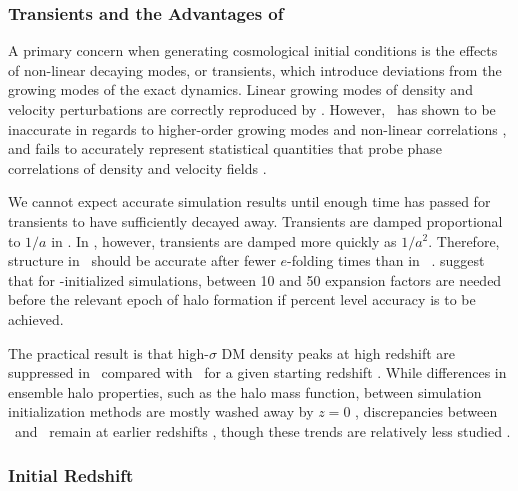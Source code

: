 \subsubsection{Transients and the Advantages of \lpt}
\label{subsubsec:computational_theory--perturbation_theory--transients}


A primary concern when generating cosmological initial conditions is the effects of non-linear decaying modes, or transients, which introduce deviations from the growing modes of the exact dynamics.  Linear growing modes of density and velocity perturbations are correctly reproduced by \za.  However, \za\ has shown to be inaccurate in regards to higher-order growing modes and non-linear correlations \citep{1987ApJ...320..448G, 1993ApJ...412L...9J, 1994ApJ...433....1B, 1994ApJ...426...14C, 1995ApJ...442...39J}, and fails to accurately represent statistical quantities that probe phase correlations of density and velocity fields \citep{1998MNRAS.299.1097S}.

We cannot expect accurate simulation results until enough time has passed for transients to have sufficiently decayed away.  Transients are damped proportional to $1 / a$ in \za.  In \lpt, however, transients are damped more quickly as $1 / a^{2}$.  Therefore, structure in \lpt\ should be accurate after fewer $e$-folding times than in \za\ \citep{1998MNRAS.299.1097S, 2006MNRAS.373..369C, 2010MNRAS.403.1859J}.  \citet{2013MNRAS.431.1866R} suggest that for \lpt-initialized simulations, between 10 and 50 expansion factors are needed before the relevant epoch of halo formation if percent level accuracy is to be achieved.

The practical result is that high-$\sigma$ DM density peaks at high redshift are suppressed in \za\ compared with \lpt\ for a given starting redshift \citep{2006MNRAS.373..369C}.  While differences in ensemble halo properties, such as the halo mass function, between simulation initialization methods are mostly washed away by $z=0$ \citep{1998MNRAS.299.1097S}, discrepancies between \za\ and \lpt\ remain at earlier redshifts \citep{2013MNRAS.431.1866R, 2014NewA...30...79L}, though these trends are relatively less studied \citep{2007ApJ...671.1160L}.



\subsubsection{Initial Redshift}
\label{subsubsec:computational_theory--perturbation_theory--initial_redshift}



